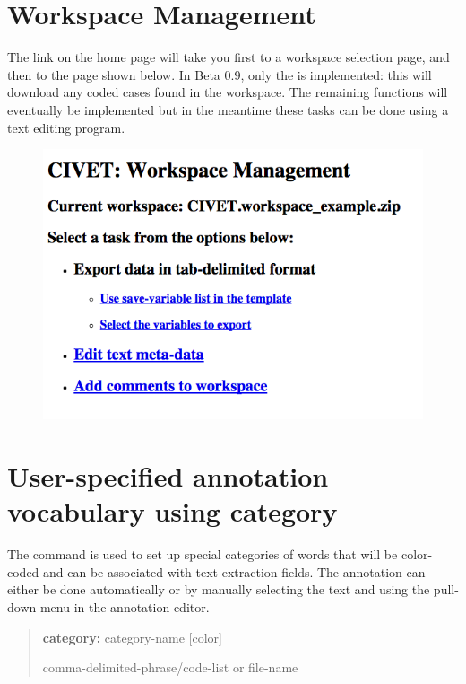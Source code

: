 \documentclass[letterpaper,10pt,english]{sphinxmanual}
\begin{document}
\section{Workspace Management}
\label{workspaces:workspace-management}\label{workspaces:sec-management}
The  link on the home page will take you first to a
workspace selection page, and then to the page shown below. In Beta 0.9, only the
is implemented: this will download any coded cases found in the
workspace. The remaining functions will eventually be implemented but in
the meantime these tasks can be done using a text editing program.
\begin{figure}[htbp]
\centering

\includegraphics{manage.png}
\end{figure}


\section{User-specified annotation vocabulary using \textbf{category}}
\label{workspaces:sec-categories}\label{workspaces:user-specified-annotation-vocabulary-using-category}
The  command is used to set up special categories of words
that will be color-coded and can be associated with text-extraction
fields. The annotation can either be done automatically or by manually
selecting the text and using the  pull-down menu in the
annotation editor.
\begin{quote}

\begin{DUlineblock}{0em}
\item[] \textbf{category:} category-name {[}color{]}
\item[] comma-delimited-phrase/code-list or file-name
\end{DUlineblock}
\end{quote}
\end{document}
